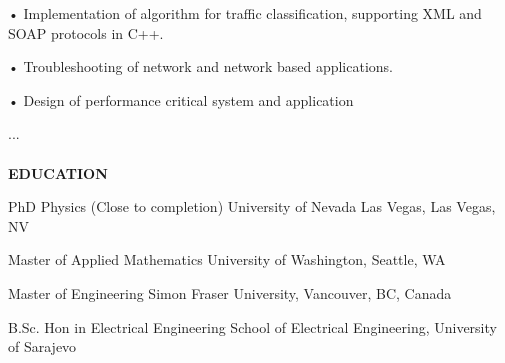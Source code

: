    • Implementation of algorithm for traffic classification, supporting XML and SOAP protocols in C++.

    • Troubleshooting of network and network based applications.

    • Design of performance critical system and application

...
\\~\\
\textbf{EDUCATION}

PhD Physics   	  (Close  to completion)					
University of Nevada Las Vegas, Las Vegas, NV

Master of Applied Mathematics						
University of Washington, Seattle, WA

Master of Engineering						
Simon Fraser University, Vancouver, BC, Canada

B.Sc. Hon in Electrical Engineering 					
School of Electrical Engineering, University of Sarajevo



